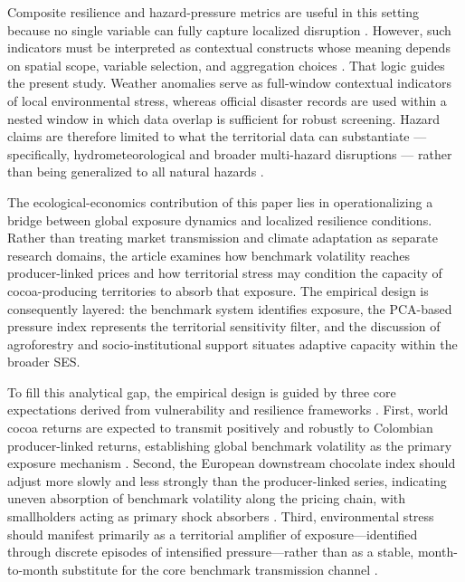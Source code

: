 \documentclass[11pt]{article}
\begin{document}
Composite resilience and hazard-pressure metrics are useful in this setting because no single variable can fully capture localized disruption \citep{Cutter2008,Parsons2021}. However, such indicators must be interpreted as contextual constructs whose meaning depends on spatial scope, variable selection, and aggregation choices \citep{Tate2012,Garschagen2021}. That logic guides the present study. Weather anomalies serve as full-window contextual indicators of local environmental stress, whereas official disaster records are used within a nested window in which data overlap is sufficient for robust screening. Hazard claims are therefore limited to what the territorial data can substantiate — specifically, hydrometeorological and broader multi-hazard disruptions — rather than being generalized to all natural hazards \citep{Birkmann2023}.

The ecological-economics contribution of this paper lies in operationalizing a bridge between global exposure dynamics and localized resilience conditions. Rather than treating market transmission and climate adaptation as separate research domains, the article examines how benchmark volatility reaches producer-linked prices and how territorial stress may condition the capacity of cocoa-producing territories to absorb that exposure. The empirical design is consequently layered: the benchmark system identifies exposure, the PCA-based pressure index represents the territorial sensitivity filter, and the discussion of agroforestry and socio-institutional support situates adaptive capacity within the broader SES.

To fill this analytical gap, the empirical design is guided by three core expectations derived from vulnerability and resilience frameworks \citep{Turner2003,Folke2006,GundersonHolling2002,Mechler2025}. First, world cocoa returns are expected to transmit positively and robustly to Colombian producer-linked returns, establishing global benchmark volatility as the primary exposure mechanism \citep{TsowouGayi2019,Poku2017}. Second, the European downstream chocolate index should adjust more slowly and less strongly than the producer-linked series, indicating uneven absorption of benchmark volatility along the pricing chain, with smallholders acting as primary shock absorbers \citep{JimenezRodriguez2022,Morales2022}. Third, environmental stress should manifest primarily as a territorial amplifier of exposure---identified through discrete episodes of intensified pressure---rather than as a stable, month-to-month substitute for the core benchmark transmission channel \citep{Garschagen2021,Djalante2011,talero_sarmiento_etal_2025}.
\end{document}
